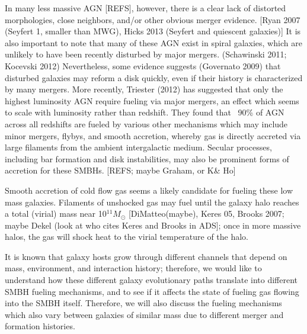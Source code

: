 \documentclass[manuscript]{aastex}
\begin{document}
	In many less massive AGN [REFS], however, there is a clear lack of distorted morphologies, close neighbors, and/or other obvious merger evidence.  [Ryan 2007 (Seyfert 1, smaller than MWG), Hicks 2013 (Seyfert and quiescent galaxies)]  It is also important to note that many of these AGN exist in spiral galaxies, which are unlikely to have been recently disturbed by major mergers. (Schawinski 2011; Kocevski 2012) Nevertheless, some evidence suggests (Governato 2009) that disturbed galaxies may reform a disk quickly, even if their history is characterized by many mergers. More recently, Triester (2012) has suggested that only the highest luminosity AGN require fueling via major mergers, an effect which seems to scale with luminosity rather than redshift. They found that ~90\% of AGN across all redshifts are fueled by various other mechanisms which may include minor mergers, flybys, and smooth accretion, whereby gas is directly accreted via large filaments from the ambient intergalactic medium. Secular processes, including bar formation and disk instabilities, may also be prominent forms of accretion for these SMBHs. [REFS; maybe Graham, or K\& Ho]  

	Smooth accretion of cold flow gas seems a likely candidate for fueling these low mass galaxies. Filaments of unshocked gas may fuel until the galaxy halo reaches a total (virial) mass near 10$^{11} M_{\odot}$ [DiMatteo(maybe), Keres 05, Brooks 2007; maybe Dekel (look at who cites Keres and Brooks in ADS]; once in more massive halos, the gas will shock heat to the virial temperature of the halo.  %



It is known that galaxy hosts grow through different channels that depend on mass, environment, and interaction history; therefore, we would like to understand how these different galaxy evolutionary paths translate into different SMBH fueling mechanisms, and to see if it affects the state of fueling gas flowing into the SMBH itself. Therefore, we will also discuss the fueling mechanisms which also vary between galaxies of similar mass due to different merger and formation histories.
	
\end{document}
